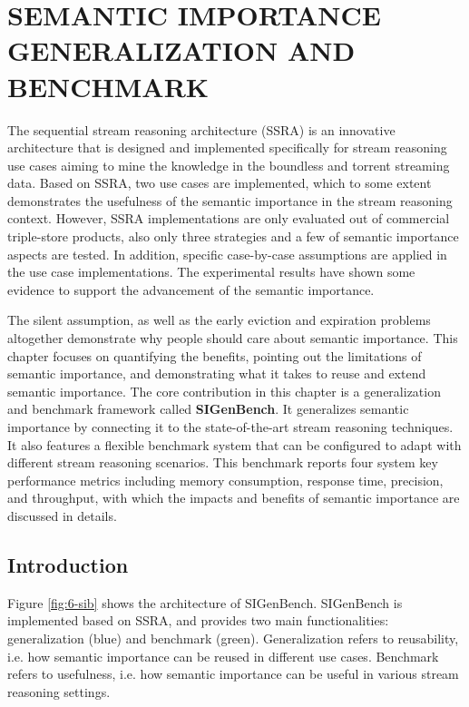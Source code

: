 \chapter{SEMANTIC IMPORTANCE GENERALIZATION AND BENCHMARK}
The sequential stream reasoning architecture (SSRA) is an innovative architecture that is designed and implemented specifically for stream reasoning use cases aiming to mine the knowledge in the boundless and torrent streaming data. 
Based on SSRA, two use cases are implemented, which to some extent demonstrates the usefulness of the semantic importance in the stream reasoning context. 
However, SSRA implementations are only evaluated out of commercial triple-store products, also only three strategies and a few of semantic importance aspects are tested.
In addition, specific case-by-case assumptions are applied in the use case implementations.
The experimental results have shown some evidence to support the advancement of the semantic importance.

The silent assumption, as well as the early eviction and expiration problems altogether demonstrate why people should care about semantic importance. 
This chapter focuses on quantifying the benefits, pointing out the  limitations of semantic importance, and demonstrating what it takes to reuse and extend semantic importance.
The core contribution in this chapter is a generalization and benchmark framework called \textbf{SIGenBench}. 
It generalizes semantic importance by connecting it to the state-of-the-art stream reasoning techniques.
It also features a flexible benchmark system that can be configured to adapt with different stream reasoning scenarios. 
This benchmark reports four system key performance metrics including memory consumption, response time, precision, and throughput, with which the impacts and benefits of semantic importance are discussed in details.  
%
\section{Introduction}
Figure \ref{fig:6-sib} shows the architecture of SIGenBench.
SIGenBench is implemented based on SSRA, and provides two main functionalities: generalization (blue) and benchmark (green).
Generalization refers to reusability, i.e. how semantic importance can be reused in different use cases.
Benchmark refers to usefulness, i.e. how semantic importance can be useful in various stream reasoning settings.

